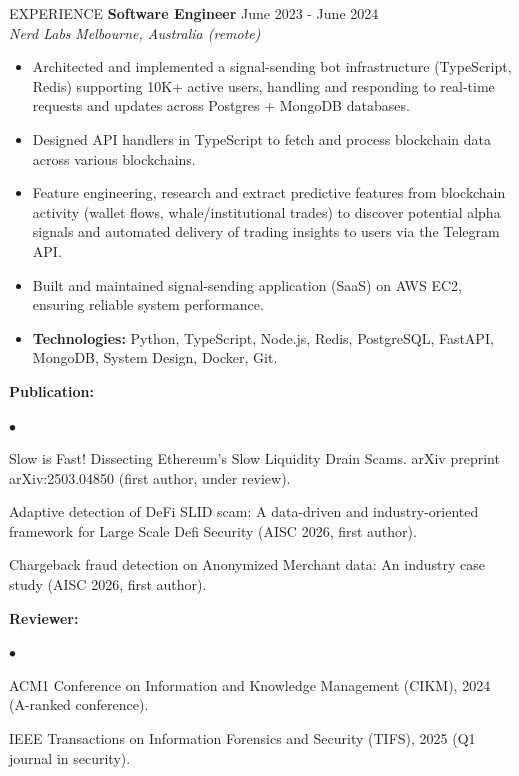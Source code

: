 \documentclass{resume}
\newenvironment{packeditemize}{
	\begin{list}{$\bullet$}{
			\setlength{\labelwidth}{4pt}
			\setlength{\itemsep}{0pt}
			\setlength{\leftmargin}{\labelwidth}
			\addtolength{\leftmargin}{\labelsep}
			\setlength{\parindent}{0pt}
			\setlength{\listparindent}{\parindent}
			\setlength{\parsep}{0pt}
			\setlength{\topsep}{1pt}}}{\end{list}}
\begin{document}
\begin{rSection}{EXPERIENCE}
{\textbf{Software Engineer}} \hfill {June 2023 - June 2024}\\
\vspace{-5pt}
\textit{Nerd Labs} \hfill {\em Melbourne, Australia (remote)}
\begin{itemize}[label=·]
    \item Architected and implemented a signal-sending bot infrastructure (TypeScript, Redis) supporting 10K+ active users, handling and responding to real-time requests and updates across Postgres + MongoDB databases.
    \vspace{-5pt}
    \item Designed API handlers in TypeScript to fetch and process blockchain data across various blockchains. 
    \vspace{-5pt}
    \item Feature engineering, research and extract predictive features from blockchain activity (wallet flows, whale/institutional trades) to discover potential alpha signals and automated delivery of trading insights to users via the Telegram API.
    \vspace{-5pt}
    \item Built and maintained signal-sending application (SaaS) on AWS EC2, ensuring reliable system performance.
    \vspace{-5pt}
    \item \textbf{Technologies:} Python, TypeScript, Node.js, Redis, PostgreSQL, FastAPI, MongoDB, System Design, Docker, Git.
\end{itemize}

\textbf{Publication:} 
\begin{packeditemize}
    \vspace{-5pt}
    \item Slow is Fast! Dissecting Ethereum’s Slow Liquidity Drain Scams. arXiv preprint arXiv:2503.04850 (first author, under review).
    \vspace{-1pt}
    \item Adaptive detection of DeFi SLID scam: A data-driven and industry-oriented framework for Large Scale Defi Security (AISC 2026, first author).
    \item Chargeback fraud detection on Anonymized Merchant data: An industry case study (AISC 2026, first author).
\end{packeditemize}

\textbf{Reviewer:} 
\begin{packeditemize}
    \vspace{-5pt}
    \item ACM1 Conference on Information and Knowledge Management (CIKM), 2024 (A-ranked conference).
    \vspace{-1pt}
    \item IEEE Transactions on Information Forensics and Security (TIFS), 2025 (Q1 journal in security).
\end{packeditemize}

\end{rSection}
\end{document}
